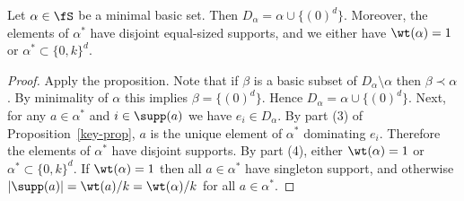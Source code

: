 \begin{cor}
    Let $\alpha \in \fS$ be a minimal basic set.
    Then $D_\alpha = \alpha \cup \{(0)^d\}$.
    Moreover, the elements of $\alpha^*$ have disjoint equal-sized supports,
    and we either have $\wt(\alpha) = 1$ or $\alpha^* \subset \{0, k\}^d$.
\end{cor}
\begin{proof}
    Apply the proposition.
    Note that if $\beta$ is a basic subset of $D_\alpha \setminus \alpha$ then $\beta \prec \alpha$.
    By minimality of $\alpha$ this implies $\beta = \{(0)^d\}$.
    Hence $D_\alpha = \alpha \cup \{(0)^d\}$.
    Next,
    for any $a \in \alpha^*$ and $i \in \supp(a)$ we have $e_i \in D_\alpha$.
    By part (3) of Proposition~\ref{key-prop}, $a$ is the unique element of $\alpha^*$ dominating $e_i$.
    Therefore the elements of $\alpha^*$ have disjoint supports.
    By part (4), either $\wt(\alpha) = 1$ or $\alpha^* \subset \{0, k\}^d$.
    If $\wt(\alpha) = 1$ then all $a \in \alpha^*$ have singleton support,
    and otherwise $|\supp(a)| = \wt(a) / k = \wt(\alpha) / k$ for all $a \in \alpha^*$.
\end{proof}
